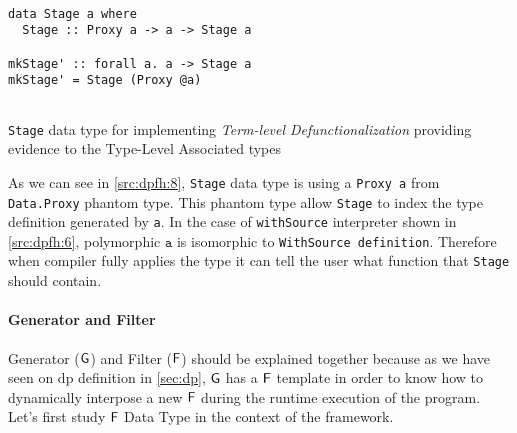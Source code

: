 \begin{listing}[htp!]
  \begin{verbatim}

data Stage a where
  Stage :: Proxy a -> a -> Stage a

mkStage' :: forall a. a -> Stage a
mkStage' = Stage (Proxy @a)
    
  \end{verbatim}
  \caption[{[\texttt{Stage.hs}] Stage Data Type}]{\texttt{Stage} data type for implementing \emph{Term-level Defunctionalization} providing evidence to the Type-Level Associated types}
  \label{src:dpfh:8}
\end{listing}

As we can see in \autoref{src:dpfh:8}, \texttt{Stage} data type is using a \texttt{Proxy a} from \texttt{Data.Proxy} phantom type. 
This phantom type allow \texttt{Stage} to index the type definition generated by \texttt{a}.
In the case of \texttt{withSource} interpreter shown in \autoref{src:dpfh:6}, polymorphic $\texttt{a}$ is isomorphic to \texttt{WithSource definition}. 
Therefore when compiler fully applies the type it can tell the user what function that \texttt{Stage} should contain.

\paragraph{Generator and Filter}
Generator ($\mathsf{G}$) and Filter ($\mathsf{F}$) should be explained together because as we have seen on \acrshort{dp} definition in \autoref{sec:dp},
$\mathsf{G}$ has a $\mathsf{F}$ template in order to know how to dynamically interpose a new $\mathsf{F}$ during the runtime execution of the program.
Let's first study $\mathsf{F}$ Data Type in the context of the framework.


